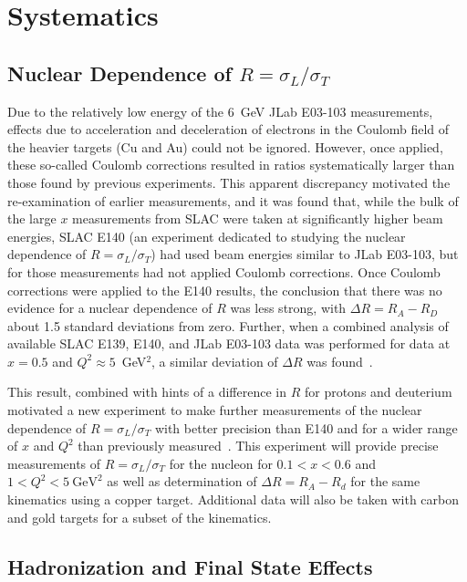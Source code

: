 \section{Systematics}
\subsection{Nuclear Dependence of $R=\sigma_L/\sigma_T$}


Due to the relatively low energy of the 6~GeV JLab E03-103 measurements, effects due to acceleration and
deceleration of electrons in the Coulomb field of the heavier targets (Cu and Au) could not be ignored.
However, once applied, these so-called Coulomb corrections resulted in ratios systematically larger
than those found by previous experiments.  This apparent discrepancy motivated the re-examination of
earlier measurements, and it was found that, while the bulk of the large $x$ measurements from SLAC
were taken at significantly higher beam energies, SLAC E140 (an experiment dedicated to studying
the nuclear dependence of $R=\sigma_L/\sigma_T$) had used beam energies similar to JLab E03-103, but for
those measurements had not applied Coulomb corrections.  Once Coulomb corrections were applied to the E140
results, the conclusion that there was no evidence for a nuclear dependence of $R$ was less strong, with
$\Delta R=R_A-R_D$ about 1.5 standard deviations from zero. Further, when a combined analysis
of available SLAC E139, E140, and JLab E03-103 data was performed for data at $x=0.5$ and $Q^2\approx5$~GeV$^2$,
a similar deviation of $\Delta R$ was found~\cite{Solvignon:2009it}.

This result, combined with hints of a difference in $R$ for protons and deuterium motivated a 
new experiment to make further measurements of the nuclear dependence of $R=\sigma_L/\sigma_T$
with better precision than E140 and for a wider range of $x$ and $Q^2$ than previously
measured~\cite{12gev_nucr}.  This experiment will provide precise measurements of $R=\sigma_L/\sigma_T$
for the nucleon for $0.1<x<0.6$ and $1<Q^2<5~\text{GeV}^2$ as well as determination of $\Delta R= R_A-R_d$ for the same
kinematics using a copper target. Additional data will also be taken with carbon and gold targets for a subset
of the kinematics.


\subsection{Hadronization and Final State Effects}

